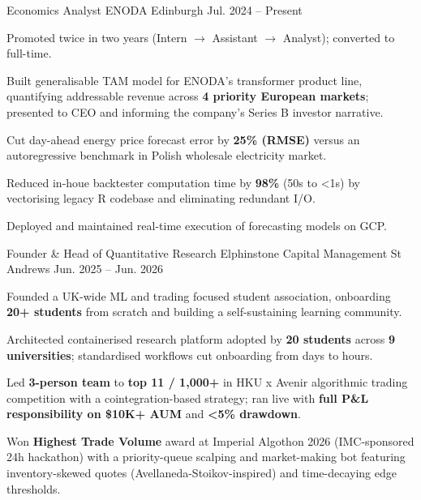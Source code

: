 

\begin{cventries}

  \cventry
    {Economics Analyst} %
    {ENODA} %
    {Edinburgh} %
    {Jul. 2024 -- Present} %
    {
      \begin{cvitems}
        \item {Promoted twice in two years (Intern $\to$ Assistant $\to$ Analyst); converted to full-time.}
        \item {Built generalisable TAM model for ENODA's transformer product line, quantifying addressable revenue across \textbf{4 priority European markets}; presented to CEO and informing the company's Series B investor narrative.}
        \item {Cut day-ahead energy price forecast error by \textbf{25\% (RMSE)} versus an autoregressive benchmark in Polish wholesale electricity market.}
        \item {Reduced in-houe backtester computation time by \textbf{98\%} (50s to <1s) by vectorising legacy R codebase and eliminating redundant I/O.}
        \item {Deployed and maintained real-time execution of forecasting models on GCP.}
      \end{cvitems}
    }

  \cventry
    {Founder \& Head of Quantitative Research} %
    {Elphinstone Capital Management} %
    {St Andrews} %
    {Jun. 2025 -- Jun. 2026} %
    {
      \begin{cvitems}
        \item {Founded a UK-wide ML and trading focused student association, onboarding \textbf{20+ students} from scratch and building a self-sustaining learning community.}
        \item {Architected containerised research platform adopted by \textbf{20 students} across \textbf{9 universities}; standardised workflows cut onboarding from days to hours.}
        \item {Led \textbf{3-person team} to \textbf{top 11 / 1,000+} in HKU x Avenir algorithmic trading competition with a cointegration-based strategy; ran live with \textbf{full P\&L responsibility on \$10K+ AUM} and \textbf{<5\% drawdown}.}
        \item {Won \textbf{Highest Trade Volume} award at Imperial Algothon 2026 (IMC-sponsored 24h hackathon) with a priority-queue scalping and market-making bot featuring inventory-skewed quotes (Avellaneda-Stoikov-inspired) and time-decaying edge thresholds.}
      \end{cvitems}
    }


\end{cventries}
